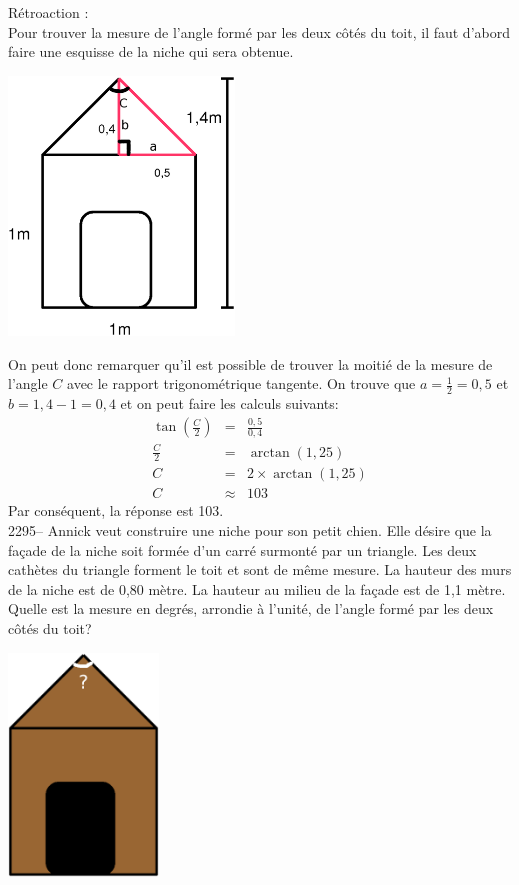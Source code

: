 \documentclass[letterpaper, 12pt]{article}
\begin{document}
R\'etroaction :\\
Pour trouver la mesure de l'angle form\'e par les deux c\^ot\'es du toit, il faut d'abord faire une esquisse de la niche qui sera obtenue.\\
\begin{center}
 \includegraphics[width=6cm,bb=14 14 555 612]{Niche2294mesures.eps}
\end{center}
On peut donc remarquer qu'il est possible de trouver la moiti\'e de la mesure de l'angle $C$ avec le rapport trigonom\'etrique tangente. On trouve que $a=\frac{1}{2}=0,5$ et $b=1,4-1=0,4$ et on peut faire les calculs suivants:
\begin{eqnarray*}
\tan{\left( \frac{C}{2}\right) }&=&\frac{0,5}{0,4}\\[2mm]
\frac{C}{2}&=&\arctan{(1,25)}\\[2mm]
C&=&2\times\arctan{(1,25)}\\[2mm]
C&\approx&103
\end{eqnarray*}
Par cons\'equent, la r\'eponse est 103.\\

2295-- Annick veut construire une niche pour son petit chien. Elle d\'esire que la fa\c cade de la niche soit form\'ee d'un carr\'e surmont\'e par un triangle. Les deux cath\`etes du triangle forment le toit et sont de m\^eme mesure. La hauteur des murs de la niche est de 0,80 m\`etre. La hauteur au milieu de la fa\c cade est de 1,1 m\`etre. Quelle est la mesure en degr\'es, arrondie \`a l'unit\'e, de l'angle form\'e par les deux c\^ot\'es du toit?
\begin{center}
 \includegraphics[width=4cm,bb=14 14 627 807]{Niche2294.eps}
\end{center}
\end{document}
